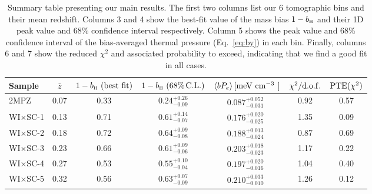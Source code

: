 \documentclass[useAMS,usenatbib]{mn2e}
\newcommand{\wisc}{WI$\times$SC}
\def\bH{b_{\scriptscriptstyle\rm H}}
\begin{document}
      \begin{table}
        \begin{center}
          \begin{tabular}{l|cccccc}
            \hline
            Sample & $\bar{z}$ & $1-\bH\,\,({\rm best\,\,fit})$ & $1-\bH\,\,(68\%\,{\rm C.L.})$ & $\langle bP_e\rangle\,[{\rm meV}\,\,{\rm cm}^{-3^{\phantom{2}}}]$ & $\chi^2/{\rm d.o.f.}$ & ${\rm PTE}(\chi^2)$\\[1ex]
            \hline
            2MPZ    & 0.07     & 0.33                         & $0.24^{+0.26}_{-0.09}$      & $0.087^{+0.052^{\phantom{A}}}_{-0.031}$                          & 0.92                  & 0.57               \\
            \wisc-1 & 0.13     & 0.71                         & $0.61^{+0.14}_{-0.07}$      & $0.176^{+0.020^{\phantom{A}}}_{-0.025}$                          & 1.35                  & 0.09               \\
            \wisc-2 & 0.18     & 0.72                         & $0.64^{+0.09}_{-0.08}$      & $0.188^{+0.013^{\phantom{A}}}_{-0.024}$                          & 0.87                  & 0.69               \\
            \wisc-3 & 0.23     & 0.66                         & $0.61^{+0.09}_{-0.06}$      & $0.203^{+0.018^{\phantom{A}}}_{-0.023}$                          & 1.17                  & 0.22               \\
            \wisc-4 & 0.27     & 0.53                         & $0.55^{+0.10}_{-0.04}$      & $0.197^{+0.020^{\phantom{A}}}_{-0.016}$                          & 1.04                  & 0.40               \\
            \wisc-5 & 0.32     & 0.56                         & $0.63^{+0.07}_{-0.09}$      & $0.210^{+0.033^{\phantom{A}}}_{-0.010_{\phantom{A}}}$                          & 1.26                  & 0.12               \\
            \hline
          \end{tabular}
          \caption{Summary table presenting our main results. The first two columns list our 6 tomographic bins and their mean redshift. Columns 3 and 4 show the best-fit value of the mass bias $1-\bH$ and their 1D peak value and 68\% confidence interval respectively. Column 5 shows the peak value and 68\% confidence interval of the bias-averaged thermal pressure (Eq.\!~\ref{eq:by}) in each bin. Finally, columns 6 and 7 show the reduced $\chi^2$ and associated probability to exceed, indicating that we find a good fit in all cases.}\label{tab:results}
        \end{center}
      \end{table}
\end{document}
